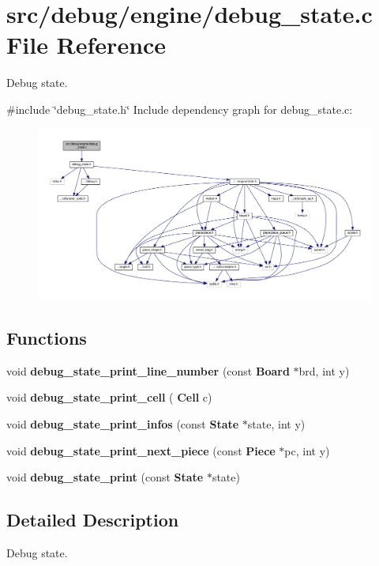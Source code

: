 \section{src/debug/engine/debug\+\_\+state.c File Reference}
\label{debug__state_8c}


Debug state.  


{\ttfamily \#include \char`\"{}debug\+\_\+state.\+h\char`\"{}}\newline
Include dependency graph for debug\+\_\+state.\+c\+:
\nopagebreak
\begin{figure}[H]
\begin{center}
\leavevmode
\includegraphics[width=350pt]{debug__state_8c__incl}
\end{center}
\end{figure}
\subsection*{Functions}
\begin{DoxyCompactItemize}
\item 
void \textbf{ debug\+\_\+state\+\_\+print\+\_\+line\+\_\+number} (const \textbf{ Board} $\ast$brd, int y)
\item 
void \textbf{ debug\+\_\+state\+\_\+print\+\_\+cell} (\textbf{ Cell} c)
\item 
void \textbf{ debug\+\_\+state\+\_\+print\+\_\+infos} (const \textbf{ State} $\ast$state, int y)
\item 
void \textbf{ debug\+\_\+state\+\_\+print\+\_\+next\+\_\+piece} (const \textbf{ Piece} $\ast$pc, int y)
\item 
void \textbf{ debug\+\_\+state\+\_\+print} (const \textbf{ State} $\ast$state)
\end{DoxyCompactItemize}


\subsection{Detailed Description}
Debug state. 

